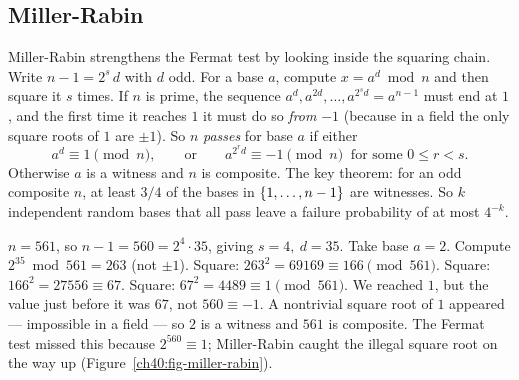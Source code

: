\subsection{Miller-Rabin}
\label{ch40:millerrabin}

Miller-Rabin strengthens the Fermat test by looking inside the squaring chain. Write $n-1 =
2^{s}\,d$ with $d$ odd. For a base $a$, compute $x = a^d \bmod n$ and then square it $s$ times. If
$n$ is prime, the sequence $a^d, a^{2d}, \dots, a^{2^s d}=a^{n-1}$ must end at $1$, and the first time
it reaches $1$ it must do so \emph{from} $-1$ (because in a field the only square roots of $1$ are
$\pm 1$). So $n$ \emph{passes} for base $a$ if either
\[
  a^d \equiv 1 \pmod n,\qquad\text{or}\qquad a^{2^r d}\equiv -1\pmod n\ \text{ for some }0\le r<s.
\]
Otherwise $a$ is a witness and $n$ is composite. The key theorem: for an odd composite $n$, at least
$3/4$ of the bases in $\{1,\dots,n-1\}$ are witnesses. So $k$ independent random bases that all
pass leave a failure probability of at most $4^{-k}$.

\begin{example}
\label{ch40:ex-mr}
$n=561$, so $n-1 = 560 = 2^4\cdot 35$, giving $s=4,\ d=35$. Take base $a=2$. Compute $2^{35}\bmod
561 = 263$ (not $\pm 1$). Square: $263^2 = 69169 \equiv 166\pmod{561}$. Square: $166^2 = 27556\equiv
67$. Square: $67^2 = 4489\equiv 1\pmod{561}$. We reached $1$, but the value just before it was $67$,
not $560\equiv -1$. A nontrivial square root of $1$ appeared --- impossible in a field --- so $2$ is a
witness and $561$ is composite. The Fermat test missed this because $2^{560}\equiv 1$; Miller-Rabin
caught the illegal square root on the way up (Figure~\ref{ch40:fig-miller-rabin}).
\end{example}

